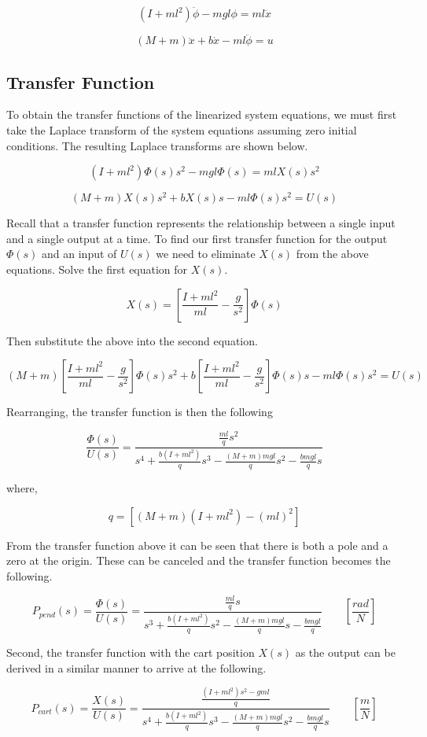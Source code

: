 \documentclass{report}
\begin{document}
$$ (I+ml^2)\ddot{\phi}-mgl\phi=ml\ddot{x} $$

$$ (M+m)\ddot{x}+b\dot{x}-ml\ddot{\phi}=u $$

\subsection{Transfer Function}
To obtain the transfer functions of the linearized system equations, we must first take the Laplace transform of the system equations assuming zero initial conditions. The resulting Laplace transforms are shown below.

$$(I+ml^2)\Phi(s)s^2-mgl\Phi(s)=mlX(s)s^2$$

$$(M+m)X(s)s^2+bX(s)s-ml\Phi(s)s^2=U(s)$$

Recall that a transfer function represents the relationship between a single input and a single output at a time. To find our first transfer function for the output $\Phi(s)$ and an input of $U(s)$ we need to eliminate $X(s)$ from the above equations. Solve the first equation for $X(s)$.

$$ X(s)=\left[{\frac{I+ml^2}{ml}-\frac{g}{s^2}}\right]\Phi(s) $$

Then substitute the above into the second equation.

$$(M+m)\left[\frac{I+ml^2}{ml}-\frac{g}{s^2}\right]\Phi(s)s^2+b\left[\frac{I+ml^2}{ml}-\frac{g}{s^2}\right]\Phi(s)s-ml\Phi(s)s^2=U(s)$$

Rearranging, the transfer function is then the following

$$\frac{\Phi(s)}{U(s)}=\frac{\frac{ml}{q}s^2}{s^4+\frac{b(I+ml^2)}{q}s^3-\frac{(M+m)mgl}{q}s^2-\frac{bmgl}{q}s}$$

where,

$$q=[(M+m)(I+ml^2)-(ml)^2]$$

From the transfer function above it can be seen that there is both a pole and a zero at the origin. These can be canceled and the transfer function becomes the following.

$$P_{pend}(s) = \frac{\Phi(s)}{U(s)}=\frac{\frac{ml}{q}s}{s^3+\frac{b(I+ml^2)}{q}s^2-\frac{(M+m)mgl}{q}s-\frac{bmgl}{q}} \qquad [ \frac{rad}{N}]$$

Second, the transfer function with the cart position $X(s)$ as the output can be derived in a similar manner to arrive at the following.

$$P_{cart}(s) = \frac{X(s)}{U(s)} = \frac{ \frac{ (I+ml^2)s^2 - gml } {q} }{s^4+\frac{b(I+ml^2)}{q}s^3-\frac{(M+m)mgl}{q}s^2-\frac{bmgl}{q}s} \qquad [ \frac{m}{N}] $$
\end{document}
